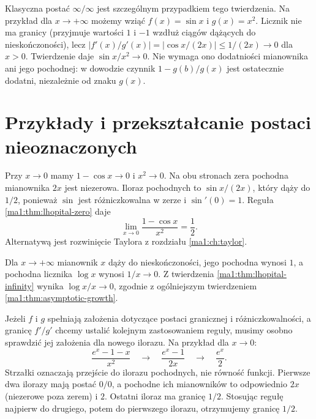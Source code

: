Klasyczna postać $\infty/\infty$ jest szczególnym przypadkiem tego twierdzenia. Na przykład dla $x\to+\infty$ możemy wziąć $f(x)=\sin x$ i $g(x)=x^2$. Licznik nie ma granicy (przyjmuje wartości $1$ i $-1$ wzdłuż ciągów dążących do nieskończoności), lecz $|f'(x)/g'(x)|=|\cos x/(2x)|\le 1/(2x)\to0$ dla $x>0$. Twierdzenie daje $\sin x/x^2\to0$. Nie wymaga ono dodatniości mianownika ani jego pochodnej: w dowodzie czynnik $1-g(b)/g(x)$ jest ostatecznie dodatni, niezależnie od znaku $g(x)$.

\section{Przykłady i przekształcanie postaci nieoznaczonych}
\begin{przyklad}
\label{ma1:ex:lhopital-examples}
Przy $x\to0$ mamy $1-\cos x\to0$ i $x^2\to0$. Na obu stronach zera pochodna mianownika $2x$ jest niezerowa. Iloraz pochodnych to $\sin x/(2x)$, który dąży do $1/2$, ponieważ $\sin$ jest różniczkowalna w zerze i $\sin'(0)=1$. Reguła \ref{ma1:thm:lhopital-zero} daje
\[
 \lim_{x\to0}\frac{1-\cos x}{x^2}=\frac12.
\]
Alternatywą jest rozwinięcie Taylora z rozdziału \ref{ma1:ch:taylor}.

Dla $x\to+\infty$ mianownik $x$ dąży do nieskończoności, jego pochodna wynosi $1$, a pochodna licznika $\log x$ wynosi $1/x\to0$. Z twierdzenia \ref{ma1:thm:lhopital-infinity} wynika $\log x/x\to0$, zgodnie z ogólniejszym twierdzeniem \ref{ma1:thm:asymptotic-growth}.

Jeżeli $f$ i $g$ spełniają założenia dotyczące postaci granicznej i różniczkowalności, a granicę $f'/g'$ chcemy ustalić kolejnym zastosowaniem reguły, musimy osobno sprawdzić jej założenia dla nowego ilorazu. Na przykład dla $x\to0$:
\[
 \frac{e^x-1-x}{x^2}
 \quad\longrightarrow\quad \frac{e^x-1}{2x}
 \quad\longrightarrow\quad \frac{e^x}{2}.
\]
Strzałki oznaczają przejście do ilorazu pochodnych, nie równość funkcji. Pierwsze dwa ilorazy mają postać $0/0$, a pochodne ich mianowników to odpowiednio $2x$ (niezerowe poza zerem) i $2$. Ostatni iloraz ma granicę $1/2$. Stosując regułę najpierw do drugiego, potem do pierwszego ilorazu, otrzymujemy granicę $1/2$.
\end{przyklad}

